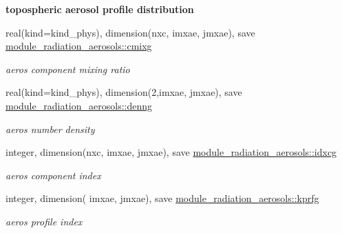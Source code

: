 \begin{Indent}\textbf{ topospheric aerosol profile distribution}\par
\begin{DoxyCompactItemize}
\item 
real(kind=kind\+\_\+phys), dimension(nxc, imxae, jmxae), save \hyperlink{group__module__radiation__aerosols_ga358c83599fb321a59c958e54d9f284d9}{module\+\_\+radiation\+\_\+aerosols\+::cmixg}
\begin{DoxyCompactList}\small\item\em aeros component mixing ratio \end{DoxyCompactList}\item 
real(kind=kind\+\_\+phys), dimension(2,imxae, jmxae), save \hyperlink{group__module__radiation__aerosols_ga0ccc698bc870cb6ccbc1c2b64a3f45f6}{module\+\_\+radiation\+\_\+aerosols\+::denng}
\begin{DoxyCompactList}\small\item\em aeros number density \end{DoxyCompactList}\item 
integer, dimension(nxc, imxae, jmxae), save \hyperlink{group__module__radiation__aerosols_ga4cb38abaf6ece5a0ed717edd6f6b4078}{module\+\_\+radiation\+\_\+aerosols\+::idxcg}
\begin{DoxyCompactList}\small\item\em aeros component index \end{DoxyCompactList}\item 
integer, dimension( imxae, jmxae), save \hyperlink{group__module__radiation__aerosols_ga28df10ba381278cc7474bea0bfdaa870}{module\+\_\+radiation\+\_\+aerosols\+::kprfg}
\begin{DoxyCompactList}\small\item\em aeros profile index \end{DoxyCompactList}\end{DoxyCompactItemize}
\end{Indent}
